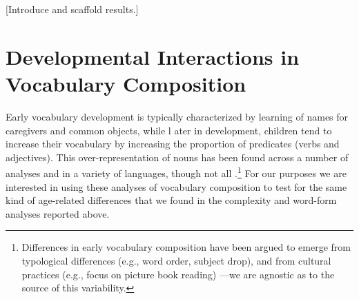 \documentclass[10pt,letterpaper]{article}
\begin{document}





[Introduce and scaffold results.]

\section{Developmental Interactions in Vocabulary Composition}

Early vocabulary development is typically characterized by learning of names for caregivers and common objects, while l ater in development, children tend to increase their vocabulary by increasing the proportion of predicates (verbs and adjectives). This over-representation of nouns has been found across a number of analyses and in a variety of languages, though not all \cite{caselli1995}.\footnote{Differences in early vocabulary composition have been argued to emerge from typological differences (e.g., word order, subject drop), and from cultural practices (e.g., focus on picture book reading) \cite{tardif1999, gopnik1996, choi1995}---we are agnostic as to the source of this variability.} For our purposes we are interested in using these analyses of vocabulary composition to test for the same kind of age-related differences that we found in the complexity and word-form analyses reported above. 
\end{document}
